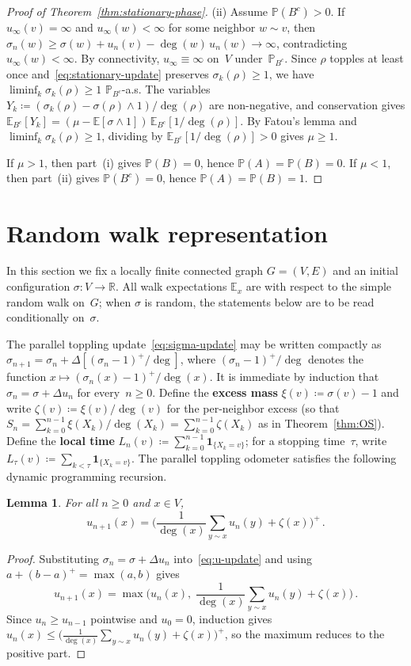 \documentclass[aop]{imsart}
\theoremstyle{plain}
\newtheorem{lemma}[theorem]{Lemma}
\theoremstyle{definition}
\newcommand{\R}{\mathbb{R}}
\newcommand{\E}{\mathbb{E}}
\renewcommand{\P}{\mathbb{P}}
\newcommand{\one}{\mathbf{1}}
\begin{document}
\begin{proof}[Proof of Theorem~\ref{thm:stationary-phase}]
		\medskip
		\textup{(ii)}\;
		Assume $\P(B^c)>0$. If $u_\infty(v)=\infty$ and $u_\infty(w)<\infty$ for some neighbor $w\sim v$, then $\sigma_n(w)\geq\sigma(w)+u_n(v)-\deg(w)\,u_n(w)\to\infty$, contradicting $u_\infty(w)<\infty$. By connectivity, $u_\infty\equiv\infty$ on~$V$ under~$\P_{B^c}$. Since $\rho$ topples at least once and~\eqref{eq:stationary-update} preserves $\sigma_k(\rho)\geq 1$, we have $\liminf_k\sigma_k(\rho)\geq 1$ $\P_{B^c}$-a.s. The variables $Y_k\coloneqq(\sigma_k(\rho)-\sigma(\rho)\wedge 1)/\deg(\rho)$ are non-negative, and conservation gives $\E_{B^c}[Y_k]=(\mu-\E[\sigma\wedge 1])\,\E_{B^c}[1/\deg(\rho)]$. By Fatou's lemma and $\liminf_k\sigma_k(\rho)\geq 1$, dividing by $\E_{B^c}[1/\deg(\rho)]>0$ gives $\mu\geq 1$.
		
		\medskip
		If $\mu>1$, then part~(i) gives $\P(B)=0$, hence $\P(A)=\P(B)=0$. If $\mu<1$, then part~(ii) gives $\P(B^c)=0$, hence $\P(A)=\P(B)=1$.
	\end{proof}
	
	\section{Random walk representation}\label{sec:rw-rep}
	In this section we fix a locally finite connected graph $G=(V,E)$ and an initial configuration $\sigma\colon V\to\R$. All walk expectations $\E_x$ are with respect to the simple random walk on~$G$; when $\sigma$ is random, the statements below are to be read conditionally on~$\sigma$.
	
	The parallel toppling update~\eqref{eq:sigma-update} may be written compactly as $\sigma_{n+1} = \sigma_n + \Delta[(\sigma_n - 1)^+/\deg]$, where $(\sigma_n - 1)^+/\deg$ denotes the function $x \mapsto (\sigma_n(x) - 1)^+/\deg(x)$. It is immediate by induction that $\sigma_n = \sigma + \Delta u_n$ for every~$n \geq 0$.
	Define the \textbf{excess mass} $\xi(v)\coloneqq\sigma(v)-1$ and write $\zeta(v)\coloneqq\xi(v)/\deg(v)$ for the per-neighbor excess (so that $S_n=\sum_{k=0}^{n-1}\xi(X_k)/\deg(X_k)=\sum_{k=0}^{n-1}\zeta(X_k)$ as in Theorem~\ref{thm:OS}). Define the \textbf{local time} $L_n(v)\coloneqq\sum_{k=0}^{n-1}\one_{\{X_k=v\}}$; for a stopping time~$\tau$, write $L_\tau(v)\coloneqq\sum_{k<\tau}\one_{\{X_k=v\}}$.
	The parallel toppling odometer satisfies the following dynamic programming recursion.
	\begin{lemma}\label{lem:recursion}
		For all $n \geq 0$ and $x \in V$,
		\[
		u_{n+1}(x) = \biggl(\frac{1}{\deg(x)}\sum_{y \sim x} u_n(y) + \zeta(x)\biggr)^+\,.
		\]
	\end{lemma}
	\begin{proof}
		Substituting $\sigma_n = \sigma + \Delta u_n$ into~\eqref{eq:u-update} and using $a + (b - a)^+ = \max(a, b)$ gives
		\[
		u_{n+1}(x) = \max\biggl(u_n(x),\; \frac{1}{\deg(x)}\sum_{y \sim x} u_n(y) + \zeta(x)\biggr)\,.
		\]
		Since $u_n \geq u_{n-1}$ pointwise and $u_0 = 0$, induction gives $u_n(x) \leq \bigl(\frac{1}{\deg(x)}\sum_{y \sim x} u_n(y) + \zeta(x)\bigr)^+$, so the maximum reduces to the positive part.
	\end{proof}
	
\end{document}
